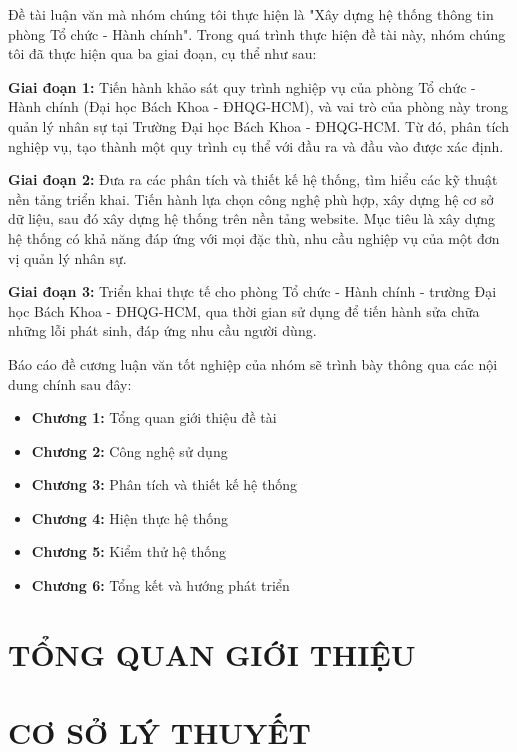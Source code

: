 \documentclass[12pt, a4paper]{report}
\begin{document}
\begin{sumary}
    Đề tài luận văn mà nhóm chúng tôi thực hiện là "Xây dựng hệ thống thông tin phòng Tổ chức - Hành chính". Trong quá trình thực hiện đề tài này, nhóm chúng tôi đã thực hiện qua ba giai đoạn, cụ thể như sau:

\textbf{Giai đoạn 1: } Tiến hành khảo sát quy trình nghiệp vụ của phòng Tổ chức - Hành chính (Đại học Bách Khoa - ĐHQG-HCM), và vai trò của phòng này trong quản lý nhân sự tại Trường Đại học Bách Khoa - ĐHQG-HCM. Từ đó, phân tích nghiệp vụ, tạo thành một quy trình cụ thể với đầu ra và đầu vào được xác định.

\textbf{Giai đoạn 2: } Đưa ra các phân tích và thiết kế hệ thống, tìm hiểu các kỹ thuật nền tảng triển khai. Tiến hành lựa chọn công nghệ phù hợp, xây dựng hệ cơ sở dữ liệu, sau đó xây dựng hệ thống trên nền tảng website. Mục tiêu là xây dựng hệ thống có khả năng đáp ứng với mọi đặc thù, nhu cầu nghiệp vụ của một đơn vị quản lý nhân sự.

\textbf{Giai đoạn 3: } Triển khai thực tế cho phòng Tổ chức - Hành chính - trường Đại học Bách Khoa - ĐHQG-HCM, qua thời gian sử dụng để tiến hành sửa chữa những lỗi phát sinh, đáp ứng nhu cầu người dùng.

    Báo cáo đề cương luận văn tốt nghiệp của nhóm sẽ trình bày thông qua các nội dung chính sau đây:
    \begin{itemize}
        \item \textbf{Chương 1:} Tổng quan giới thiệu đề tài
        \item \textbf{Chương 2:} Công nghệ sử dụng
        \item \textbf{Chương 3:} Phân tích và thiết kế hệ thống
        \item \textbf{Chương 4:} Hiện thực hệ thống
        \item \textbf{Chương 5:} Kiểm thử hệ thống
        \item \textbf{Chương 6:} Tổng kết và hướng phát triển
    \end{itemize}
\end{sumary}
\tableofcontents
\newpage
\listoffigures
\newpage
\listoftables
\newpage

\chapter{\textbf{TỔNG QUAN GIỚI THIỆU}}
\newpage

\newpage
\chapter{\textbf{CƠ SỞ LÝ THUYẾT}}
\newpage

\newpage
\end{document}

